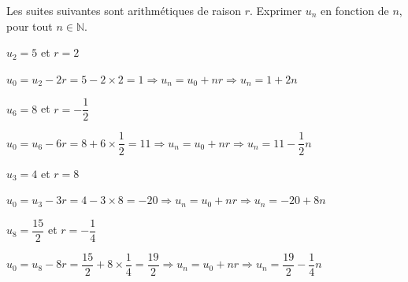 \documentclass[12pt,a4paper]{article}  %
\begin{document}
Les suites suivantes sont arithmétiques de raison $r$. Exprimer $u_{n}$ en fonction de $n$, pour tout $n \in \mathbb{N}$.
\begin{enumMet}
    \item $u_{2}=5$ et $r=2$\\
    \begin{corrBox}
        $u_0=u_2-2r=5-2\times2=1\Longrightarrow u_n=u_0+nr \Longrightarrow u_n=1+2n$
    \end{corrBox}
    \item $u_{6}=8$ et $r=-\dfrac{1}{2}$\\
    \begin{corrBox}
        $u_0=u_6-6r=8+6\times\dfrac{1}{2}=11\Longrightarrow u_n=u_0+nr \Longrightarrow u_n=11-\dfrac{1}{2}n$
    \end{corrBox}
    \item {} $u_{3}=4$ et $r=8$\\
    \begin{corrBox}
        $u_0=u_3-3r=4-3\times8=-20\Longrightarrow u_n=u_0+nr \Longrightarrow u_n=-20+8n$
    \end{corrBox}
    \item $u_{8}=\dfrac{15}{2}$ et $r=-\dfrac{1}{4}$\\
    \begin{corrBox}
        $u_0=u_8-8r=\dfrac{15}{2}+8\times\dfrac{1}{4}=\dfrac{19}{2}\Longrightarrow u_n=u_0+nr \Longrightarrow u_n=\dfrac{19}{2}-\dfrac{1}{4}n$
    \end{corrBox}
\end{enumMet}
\end{document}
